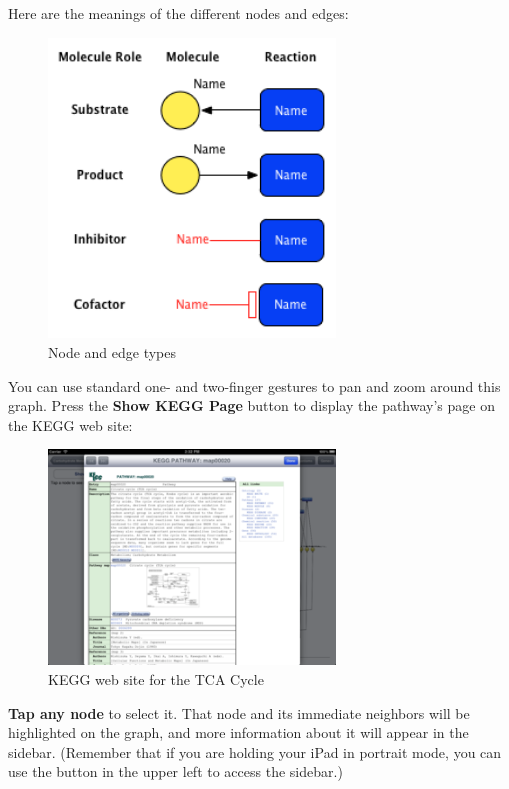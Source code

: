  \pagebreak 

Here are the meanings of the different nodes and edges:

\begin{figure}[ht!]
\centering
\includegraphics[width=3in]{kegg_manual/node_legend.png}
\caption{Node and edge types}
\label{}
\end{figure}



You can use standard one- and two-finger gestures to pan and zoom around this
graph. Press the \textbf{Show KEGG Page} button to display the pathway's page on the
KEGG web site:

\begin{figure}[ht!]
\centering
\includegraphics[width=3in]{kegg_manual/kegg_web_site.png}
\caption{KEGG web site for the TCA Cycle}
\label{}
\end{figure}




\textbf{Tap any node} to select it. That node and its immediate neighbors will be
highlighted on the graph, and more information about it will appear in the
sidebar. (Remember that if you are holding your iPad in portrait mode, you can
use the button in the upper left to access the sidebar.)

